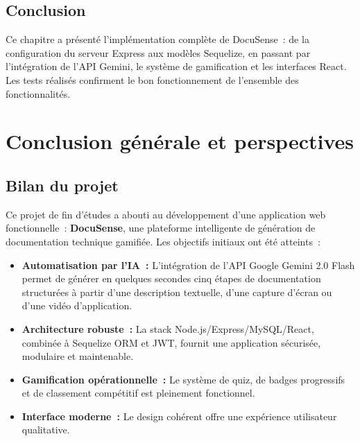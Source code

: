 \documentclass[12pt, a4paper, twoside, openany]{report}
\begin{document}
\section{Conclusion}

Ce chapitre a pr\'esent\'e l'impl\'ementation compl\`ete de DocuSense~: de la
configuration du serveur Express aux mod\`eles Sequelize, en passant par l'int\'egration
de l'API Gemini, le syst\`eme de gamification et les interfaces React. Les tests
r\'ealis\'es confirment le bon fonctionnement de l'ensemble des fonctionnalit\'es.

\clearpage
\chapter*{Conclusion g\'en\'erale et perspectives}

\section*{Bilan du projet}

Ce projet de fin d'\'etudes a abouti au d\'eveloppement d'une application web
fonctionnelle~: \textbf{DocuSense}, une plateforme intelligente de g\'en\'eration
de documentation technique gamifi\'ee. Les objectifs initiaux ont \'et\'e atteints~:

\begin{itemize}
  \item \textbf{Automatisation par l'IA~:} L'int\'egration de l'API Google Gemini
        2.0 Flash permet de g\'en\'erer en quelques secondes cinq \'etapes de
        documentation structur\'ees \`a partir d'une description textuelle, d'une
        capture d'\'ecran ou d'une vid\'eo d'application.
  \item \textbf{Architecture robuste~:} La stack Node.js/Express/MySQL/React,
        combin\'ee \`a Sequelize ORM et JWT, fournit une application s\'ecuris\'ee,
        modulaire et maintenable.
  \item \textbf{Gamification op\'erationnelle~:} Le syst\`eme de quiz, de badges
        progressifs et de classement comp\'etitif est pleinement fonctionnel.
  \item \textbf{Interface moderne~:} Le design coh\'erent offre une exp\'erience
        utilisateur qualitative.
\end{itemize}
\end{document}

